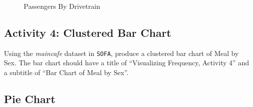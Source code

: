\begin{enumerate}
  \begin{figure}[H]
    \begin{center}
      \caption{Passengers By Drivetrain}
    \end{center}
  \end{figure}
  
\end{enumerate}

\subsection{Activity 4: Clustered Bar Chart} \label{vfr:act04}

Using the \textit{maincafe} dataset in \texttt{SOFA}, produce a clustered bar chart of Meal by Sex. The bar chart should have a title of ``Visualizing Frequency, Activity 4'' and a subtitle of ``Bar Chart of Meal by Sex''.

\subsection{Pie Chart}

